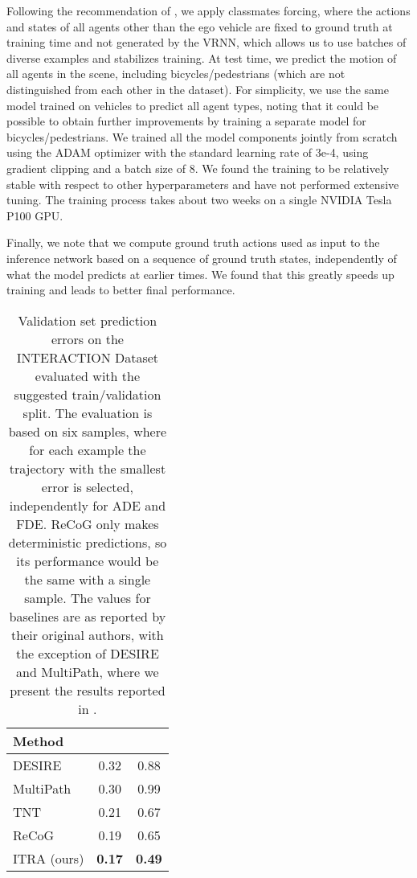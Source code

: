 \documentclass[letterpaper, 10 pt, conference]{ieeeconf}
\begin{document}
Following the recommendation of \cite{tang_multiple_2019}, we apply classmates forcing, where the actions and states of all agents other than the ego vehicle are fixed to ground truth at training time and not generated by the VRNN, which allows us to use batches of diverse examples and stabilizes training. At test time, we predict the motion of all agents in the scene, including bicycles/pedestrians (which are not distinguished from each other in the dataset). For simplicity, we use the same model trained on vehicles to predict all agent types, noting that it could be possible to obtain further improvements by training a separate model for bicycles/pedestrians. We trained all the model components jointly from scratch using the ADAM optimizer \cite{kingma_adam_2017} with the standard learning rate of 3e-4, using gradient clipping and a batch size of 8. We found the training to be relatively stable with respect to other hyperparameters and have not performed extensive tuning. The training process takes about two weeks on a single NVIDIA Tesla P100 GPU.

Finally, we note that we compute ground truth actions used as input to the inference network based on a sequence of ground truth states, independently of what the model predicts at earlier times. We found that this greatly speeds up training and leads to better final performance.


\begin{table}[t]
    \centering
    \caption{Validation set prediction errors on the INTERACTION Dataset evaluated with the suggested train/validation split. The evaluation is based on six samples, where for each example the trajectory with the smallest error is selected, independently for ADE and FDE. ReCoG only makes deterministic predictions, so its performance would be the same with a single sample. The values for baselines are as reported by their original authors, with the exception of DESIRE and MultiPath, where we present the results reported in \cite{zhao_tnt_2020}.}
    \label{tab:main-results}
    \begin{tabular}{l|cc}
    \hline
    Method &  &  \\
    \hline
    DESIRE\cite{lee_desire_2017} & 0.32 & 0.88 \\
    MultiPath\cite{chai_multipath_2019} & 0.30 & 0.99 \\
    TNT\cite{zhao_tnt_2020} & 0.21 & 0.67 \\
    ReCoG\cite{mo_recog_2020} & 0.19 & 0.65 \\
    ITRA (ours) & \bf{0.17} & \bf{0.49} \\
    \hline
    \end{tabular}
\end{table}
\end{document}
